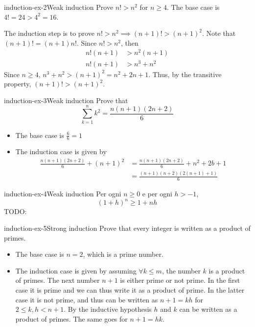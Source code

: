\documentclass[preview]{standalone}
\begin{document}
\begin{snippetexercise}{induction-ex-2}{Weak induction}
    Prove \(n! > n^2\) for \(n \geq 4\).
    The base case is \(4!=24 > 4^2 = 16\).

    The induction step is to prove \(n! > n^2 \implies (n +1)! > {(n+1)}^2\).
    Note that \((n+1)!=(n+1)n!\).
    Since \(n! > n^2\), then
    \begin{align*}
        n!(n+1) &> n^2(n+1) \\
        n!(n+1) &> n^3 + n^2
    \end{align*}
    Since \(n \geq 4\), \(n^3 + n^2 > {(n+1)}^2=n^2+2n+1\).
    Thus, by the transitive property, \((n+1)! > {(n+1)}^2\).
\end{snippetexercise}

\begin{snippetexercise}{induction-ex-3}{Weak induction}
    Prove that
    \[
        \sum_{k=1}^n k^2 = \frac{n(n+1)(2n+2)}{6}
    \]
    \begin{itemize}
        \item The base case is \(\frac{6}{6}=1\)
        \item The induction case is given by
        \begin{align*}
            \frac{n(n+1)(2n+2)}{6} + {(n+1)}^2  &= \frac{n(n+1)(2n+2)}{6} + n^2 + 2b + 1 \\
            &= \frac{(n+1)(n+2)(2(n+1)+1)}{6}
        \end{align*}
    \end{itemize}
\end{snippetexercise}

\begin{snippetexercise}{induction-ex-4}{Weak induction}
    Per ogni \(n \geq 0\) e per ogni \(h > -1\),
    \[
        {(1+h)}^n \geq 1 + nh
    \]
    TODO:
\end{snippetexercise}

\begin{snippetexercise}{induction-ex-5}{Strong induction}
    Prove that every integer is written as a product of primes.
    \begin{itemize}
        \item The base case is \(n=2\), which is a prime number.
        \item The induction case is given by assuming \(\forall k \leq m\),
        the number \(k\) is a product of primes. The next number \(n+1\)
        is either prime or not prime. In the first case it is prime and we can thus
        write it as a product of prime. In the latter case it is not prime, and thus can be written
        as \(n+1 = kh\) for \(2\leq k,h< n+1\).
        By the inductive hypothesis \(h\) and \(k\) can be written as a product of primes.
        The same goes for \(n+1=hk\). 
    \end{itemize}
\end{snippetexercise}
\end{document}
